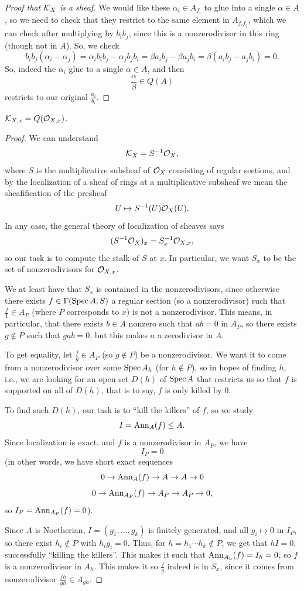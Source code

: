\documentclass[12pt]{article}
\begin{document}
\begin{proof}[Proof that $\mathcal{K}_X$ is a sheaf]
    We would like these $\alpha_i \in A_{f_i}$ to glue into a single $\alpha\in A$, so we need to check that they restrict to the same element in $A_{f_i f_j}$, which we can check after multiplying by $b_i b_j$, since this is a nonzerodivisor in this ring (though not in $A$). So, we check
    \[b_ib_j(\alpha_i - \alpha_j) = \alpha_i b_i b_j - \alpha_j b_j b_i = \beta a_i b_j - \beta a_j b_i = \beta(a_i b_j - a_j b_i) = 0.\]
    So, indeed the $\alpha_i$ glue to a single $\alpha\in A$, and then
    \[\frac{\alpha}{\beta} \in Q(A)\]
    restricts to our original $\frac{a_i}{b_i}$.
\end{proof}

\begin{prop}
    $\mathcal{K}_{X,x} = Q(\mathcal{O}_{X,x})$.
\end{prop}
\begin{proof}
    We can understand
    \[\mathcal{K}_X = S^{-1} \mathcal{O}_X,\]
    where $S$ is the multiplicative subsheaf of $\mathcal{O}_X$ consisting of regular sections, and by the localization of a sheaf of rings at a multiplicative subsheaf we mean the sheafification of the presheaf
    \[U \mapsto S^{-1}(U) \mathcal{O}_X(U).\]
    In any case, the general theory of localization of sheaves says
    \[(S^{-1} \mathcal{O}_X)_x = S_x^{-1} \mathcal{O}_{X,x},\]
    so our task is to compute the stalk of $S$ at $x$. In particular, we want $S_x$ to be the set of nonzerodivisors for $\mathcal{O}_{X,x}$.

    We at least have that $S_x$ is contained in the nonzerodivisors, since otherwise there exists $f\in \Gamma(\operatorname{Spec} A,S)$ a regular section (so a nonzerodivisor) such that $\frac{f}{1}\in A_P$ (where $P$ corresponds to $x$) is not a nonzerodivisor. This means, in particular, that there exists $b\in A$ nonzero such that $ab=0$ in $A_P$, so there exists $g\not\in P$ such that $gab=0$, but this makes $a$ a zerodivisor in $A$.

    To get equality, let $\frac{f}{g}\in A_P$ (so $g\not\in P$) be a nonzerodivisor. We want it to come from a nonzerodivisor over some $\operatorname{Spec} A_h$ (for $h\not\in P$), so in hopes of finding $h$, i.e., we are looking for an open set $D(h)$ of $\operatorname{Spec} A$ that restricts us so that $f$ is supported on all of $D(h)$, that is to say, $f$ is only killed by $0$.

    To find such $D(h)$, our task is to ``kill the killers'' of $f$, so we study
    \[I = \mathrm{Ann}_A(f) \leq A.\]
    Since localization is exact, and $f$ is a nonzerodivisor in $A_P$, we have
    \[I_P = 0\]
    (in other words, we have short exact sequences
    \[0\to \mathrm{Ann}_A(f) \to A \to A \to 0\]
    \[0\to \mathrm{Ann}_{A_P}(f) \to A_P \to A_P \to 0,\]
    so $I_P = \mathrm{Ann}_{A_P}(f) = 0$).

    Since $A$ is Noetherian, $I=(g_1,\dots,g_k)$ is finitely generated, and all $g_i\mapsto 0$ in $I_P$, so there exist $h_i\not\in P$ with $h_ig_i = 0$. Thus, for $h=h_1\cdots h_k\not\in P$, we get that $hI = 0$, successfully ``killing the killers''. This makes it such that $\mathrm{Ann}_{A_h}(f) = I_h = 0$, so $f$ is a nonzerodivisor in $A_h$. This makes it so $\frac{f}{g}$ indeed is in $S_x$, since it comes from nonzerodivisor $\frac{fh}{gh}\in A_{gh}$.
\end{proof}
\end{document}
